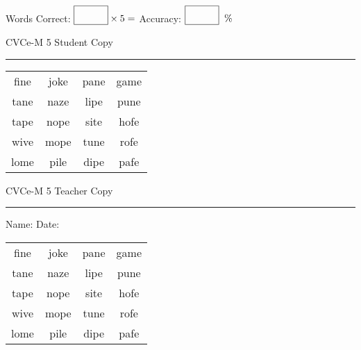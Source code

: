 \documentclass{memoir}
\begin{document}
\small

Words Correct: $\fbox{\phantom{\huge 100}} \times 5 = $ Accuracy: $\fbox{\phantom{\huge 100}}\;\; \%$ 

\vfill

\newpage


\footnotesize \noindent
CVCe-M 5 \hfill Student Copy
\smallskip
\hrule

\Large

\setlength{\tabcolsep}{14pt}
\def\arraystretch{2}

{\selectfont


\begin{vplace}[0.5]
\begin{center}
\begin{tabular}{cccc}
fine & joke & pane & game \\
tane & naze & lipe & pune \\
tape & nope & site & hofe \\
wive & mope & tune & rofe \\
lome & pile & dipe & pafe \\
\end{tabular}
\end{center}
\end{vplace}

}

\newpage

\footnotesize \noindent
CVCe-M 5 \hfill Teacher Copy
\smallskip
\hrule

\small

\vfill

\noindent
Name: \underline{\hspace{1.75in}} \hfill Date: \underline{\hspace{1in}}

\Large

{\selectfont


\begin{vplace}[0.5]
\begin{center}
\begin{tabular}{cccc}
fine & joke & pane & game \\
tane & naze & lipe & pune \\
tape & nope & site & hofe \\
wive & mope & tune & rofe \\
lome & pile & dipe & pafe \\
\end{tabular}
\end{center}
\end{vplace}



}
\end{document}
